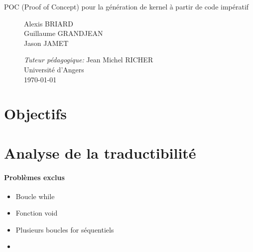 \documentclass{article}
\begin{document}
\begin{titlepage}
\begin{center}
\begin{Huge}
			\end{Huge}
			\begin{Large}
				POC (Proof of Concept) pour la génération de kernel à partir de code impératif
			\end{Large}		
			 
		\end{center}
		
		
  		\begin{figure}[b]
  		 \begin{minipage}{0.4\textwidth}
			\begin{flushleft} \large
				Alexis BRIARD\\
				Guillaume GRANDJEAN\\
				Jason JAMET
    		\end{flushleft}
    		\end{minipage}
    		\begin{minipage}{0.6\textwidth}
			\begin{flushright} \large
				\emph{Tuteur pédagogique:} Jean Michel RICHER\\				
        		Université d'Angers\\
        		\today
    		\end{flushright}
    	\end{minipage}
		\end{figure}

    	
	\end{titlepage}



\newpage


	\section{Objectifs}
	
	\section{Analyse de la traductibilité}

	
	\paragraph{Problèmes exclus}
	\begin{itemize}
  		\item Boucle while
  		\item Fonction void
  		\item Plusieurs boucles for séquentiels
  		\item 
	
	\end{itemize}
\end{document}
